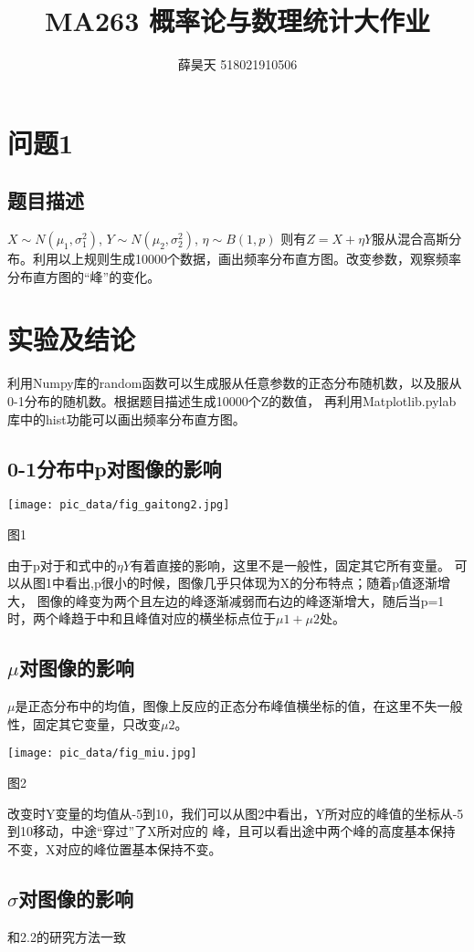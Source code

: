 \documentclass{ctexart}
\begin{document}
\title{\textbf{MA263  概率论与数理统计大作业}}
\author{薛昊天 518021910506}
\date{}
\maketitle
\section{\textbf{问题1}}
\subsection{题目描述}
    $X{\sim}N(\mu_1, \sigma_1^{2})$, $Y{\sim}N(\mu_2, \sigma_2^{2})$, $\eta\sim{B(1, p)}$
    则有$Z = X + \eta{Y}$服从混合高斯分布。利用以上规则生成10000个数据，画出频率分布直方图。改变参数，观察频率分布直方图的“峰”的变化。

\section{实验及结论}
    利用Numpy库的random函数可以生成服从任意参数的正态分布随机数，以及服从0-1分布的随机数。根据题目描述生成10000个Z的数值，
再利用Matplotlib.pylab库中的hist功能可以画出频率分布直方图。
  \subsection{0-1分布中p对图像的影响}

   \centerline{\texttt{[image: pic\_data/fig\_gaitong2.jpg]}}
   \centerline{图1}

   由于p对于和式中的$\eta{Y}$有着直接的影响，这里不是一般性，固定其它所有变量。
   可以从图1中看出,p很小的时候，图像几乎只体现为X的分布特点；随着p值逐渐增大，
   图像的峰变为两个且左边的峰逐渐减弱而右边的峰逐渐增大，随后当p=1时，两个峰趋于中和且峰值对应的横坐标点位于$\mu1+\mu2$处。
   \subsection{$\mu$对图像的影响}
   $\mu$是正态分布中的均值，图像上反应的正态分布峰值横坐标的值，在这里不失一般性，固定其它变量，只改变$\mu{2}$。

  \centerline{\texttt{[image: pic\_data/fig\_miu.jpg]}}
  \centerline{图2}
改变时Y变量的均值从-5到10，我们可以从图2中看出，Y所对应的峰值的坐标从-5到10移动，中途“穿过”了X所对应的
峰，且可以看出途中两个峰的高度基本保持不变，X对应的峰位置基本保持不变。
   \subsection{$\sigma$对图像的影响}
    和2.2的研究方法一致
\end{document}
